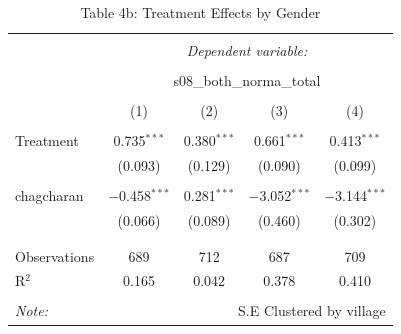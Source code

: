 \documentclass[
]{article}
\begin{document}
\begin{table}[!htbp] \centering 
  \caption{Table 4b: Treatment Effects by Gender} 
  \label{} 
\begin{tabular}{@{\extracolsep{5pt}}lcccc} 
\\[-1.8ex]\hline 
\hline \\[-1.8ex] 
 & \multicolumn{4}{c}{\textit{Dependent variable:}} \\ 
\cline{2-5} 
\\[-1.8ex] & \multicolumn{4}{c}{s08\_both\_norma\_total} \\ 
\\[-1.8ex] & (1) & (2) & (3) & (4)\\ 
\hline \\[-1.8ex] 
 Treatment & 0.735$^{***}$ & 0.380$^{***}$ & 0.661$^{***}$ & 0.413$^{***}$ \\ 
  & (0.093) & (0.129) & (0.090) & (0.099) \\ 
  & & & & \\ 
 chagcharan & $-$0.458$^{***}$ & 0.281$^{***}$ & $-$3.052$^{***}$ & $-$3.144$^{***}$ \\ 
  & (0.066) & (0.089) & (0.460) & (0.302) \\ 
  & & & & \\ 
\hline \\[-1.8ex] 
Observations & 689 & 712 & 687 & 709 \\ 
R$^{2}$ & 0.165 & 0.042 & 0.378 & 0.410 \\ 
\hline 
\hline \\[-1.8ex] 
\textit{Note:}  & \multicolumn{4}{r}{S.E Clustered by village} \\ 
\end{tabular} 
\end{table}
\end{document}
